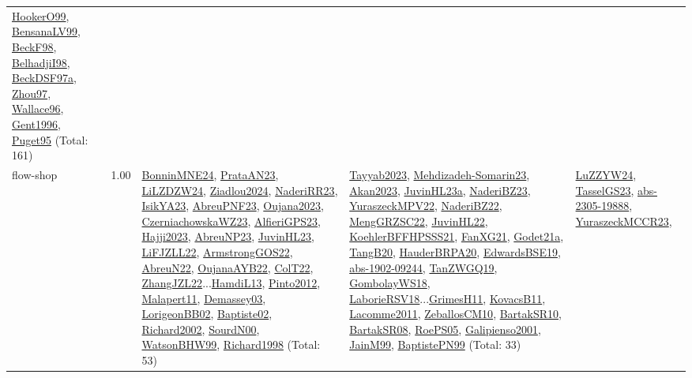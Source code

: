 {\begin{longtable}{p{3cm}r>{\raggedright\arraybackslash}p{6cm}>{\raggedright\arraybackslash}p{6cm}>{\raggedright\arraybackslash}p{8cm}}
\hyperref[detail:HookerO99]{HookerO99}, \hyperref[detail:BensanaLV99]{BensanaLV99}, \hyperref[detail:BeckF98]{BeckF98}, \hyperref[detail:BelhadjiI98]{BelhadjiI98}, \hyperref[detail:BeckDSF97a]{BeckDSF97a}, \hyperref[detail:Zhou97]{Zhou97}, \hyperref[detail:Wallace96]{Wallace96}, \hyperref[detail:Gent1996]{Gent1996}, \hyperref[detail:Puget95]{Puget95} (Total: 161)\\
\index{flow-shop}\index{Concepts!flow-shop}flow-shop &  1.00 & \hyperref[detail:BonninMNE24]{BonninMNE24}, \hyperref[detail:PrataAN23]{PrataAN23}, \hyperref[detail:LiLZDZW24]{LiLZDZW24}, \hyperref[detail:Ziadlou2024]{Ziadlou2024}, \hyperref[detail:NaderiRR23]{NaderiRR23}, \hyperref[detail:IsikYA23]{IsikYA23}, \hyperref[detail:AbreuPNF23]{AbreuPNF23}, \hyperref[detail:Oujana2023]{Oujana2023}, \hyperref[detail:CzerniachowskaWZ23]{CzerniachowskaWZ23}, \hyperref[detail:AlfieriGPS23]{AlfieriGPS23}, \hyperref[detail:Hajji2023]{Hajji2023}, \hyperref[detail:AbreuNP23]{AbreuNP23}, \hyperref[detail:JuvinHL23]{JuvinHL23}, \hyperref[detail:LiFJZLL22]{LiFJZLL22}, \hyperref[detail:ArmstrongGOS22]{ArmstrongGOS22}, \hyperref[detail:AbreuN22]{AbreuN22}, \hyperref[detail:OujanaAYB22]{OujanaAYB22}, \hyperref[detail:ColT22]{ColT22}, \hyperref[detail:ZhangJZL22]{ZhangJZL22}...\hyperref[detail:HamdiL13]{HamdiL13}, \hyperref[detail:Pinto2012]{Pinto2012}, \hyperref[detail:Malapert11]{Malapert11}, \hyperref[detail:Demassey03]{Demassey03}, \hyperref[detail:LorigeonBB02]{LorigeonBB02}, \hyperref[detail:Baptiste02]{Baptiste02}, \hyperref[detail:Richard2002]{Richard2002}, \hyperref[detail:SourdN00]{SourdN00}, \hyperref[detail:WatsonBHW99]{WatsonBHW99}, \hyperref[detail:Richard1998]{Richard1998} (Total: 53) & \hyperref[detail:Tayyab2023]{Tayyab2023}, \hyperref[detail:Mehdizadeh-Somarin23]{Mehdizadeh-Somarin23}, \hyperref[detail:Akan2023]{Akan2023}, \hyperref[detail:JuvinHL23a]{JuvinHL23a}, \hyperref[detail:NaderiBZ23]{NaderiBZ23}, \hyperref[detail:YuraszeckMPV22]{YuraszeckMPV22}, \hyperref[detail:NaderiBZ22]{NaderiBZ22}, \hyperref[detail:MengGRZSC22]{MengGRZSC22}, \hyperref[detail:JuvinHL22]{JuvinHL22}, \hyperref[detail:KoehlerBFFHPSSS21]{KoehlerBFFHPSSS21}, \hyperref[detail:FanXG21]{FanXG21}, \hyperref[detail:Godet21a]{Godet21a}, \hyperref[detail:TangB20]{TangB20}, \hyperref[detail:HauderBRPA20]{HauderBRPA20}, \hyperref[detail:EdwardsBSE19]{EdwardsBSE19}, \hyperref[detail:abs-1902-09244]{abs-1902-09244}, \hyperref[detail:TanZWGQ19]{TanZWGQ19}, \hyperref[detail:GombolayWS18]{GombolayWS18}, \hyperref[detail:LaborieRSV18]{LaborieRSV18}...\hyperref[detail:GrimesH11]{GrimesH11}, \hyperref[detail:KovacsB11]{KovacsB11}, \hyperref[detail:Lacomme2011]{Lacomme2011}, \hyperref[detail:ZeballosCM10]{ZeballosCM10}, \hyperref[detail:BartakSR10]{BartakSR10}, \hyperref[detail:BartakSR08]{BartakSR08}, \hyperref[detail:RoePS05]{RoePS05}, \hyperref[detail:Galipienso2001]{Galipienso2001}, \hyperref[detail:JainM99]{JainM99}, \hyperref[detail:BaptistePN99]{BaptistePN99} (Total: 33) & \hyperref[detail:LuZZYW24]{LuZZYW24}, \hyperref[detail:TasselGS23]{TasselGS23}, \hyperref[detail:abs-2305-19888]{abs-2305-19888}, \hyperref[detail:YuraszeckMCCR23]{YuraszeckMCCR23}, 
\end{longtable}}
